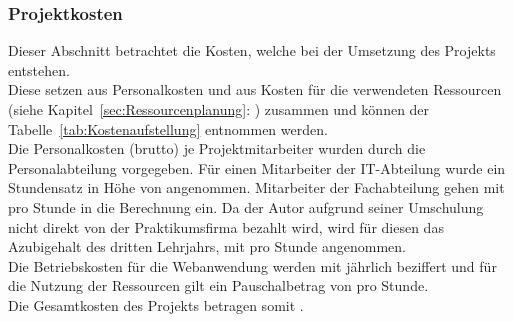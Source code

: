 \subsubsection{Projektkosten}
\label{sec:Projektkosten}
Dieser Abschnitt betrachtet die Kosten, welche bei der Umsetzung des Projekts entstehen.\\ 
Diese setzen aus Personalkosten und aus Kosten für die verwendeten Ressourcen
(siehe Kapitel~\ref{sec:Ressourcenplanung}: ) zusammen und 
können der Tabelle~\ref{tab:Kostenaufstellung} entnommen werden.\\
Die Personalkosten (brutto) je Projektmitarbeiter wurden durch die Personalabteilung vorgegeben. 
Für einen Mitarbeiter der IT-Abteilung wurde ein Stundensatz in Höhe von  angenommen. Mitarbeiter
der Fachabteilung gehen mit  pro Stunde in die Berechnung ein. Da der Autor aufgrund seiner Umschulung
nicht direkt von der Praktikumsfirma bezahlt wird, wird für diesen das Azubigehalt des dritten Lehrjahrs,
mit  pro Stunde angenommen.\\
Die Betriebskosten für die Webanwendung werden mit jährlich  beziffert und für die Nutzung der Ressourcen 
gilt ein Pauschalbetrag von  pro Stunde. \\
Die Gesamtkosten des Projekts betragen somit . 

